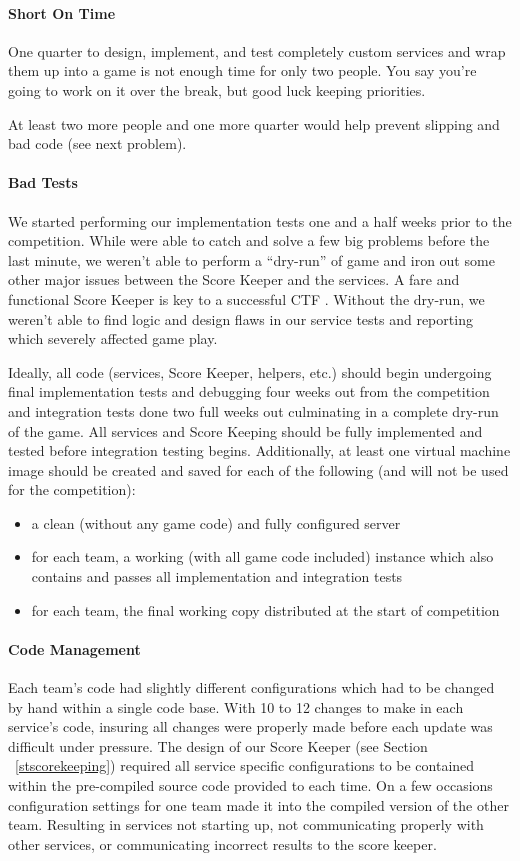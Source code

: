 \documentclass[10pt]{article}
\begin{document}
\paragraph*{Short On Time} One quarter to design, implement, and test completely
custom services and wrap them up into a game is not enough time for only two
people. You say you're going to work on it over the break, but good luck keeping
priorities.

At least two more people and one more quarter would help prevent slipping and
bad code (see next problem).

\paragraph*{Bad Tests} We started performing our implementation tests one and a
half weeks prior to the competition. While were able to catch and solve a few
big problems before the last minute, we weren't able to perform a ``dry-run'' of
game and iron out some other major issues between the Score Keeper and the
services. A fare and functional Score Keeper is key to a successful CTF
\cite{BlackHat2004}. Without the dry-run, we weren't able to find logic and
design flaws in our service tests and reporting which severely affected game
play.

Ideally, all code (services, Score Keeper, helpers, etc.) should begin
undergoing final implementation tests and debugging four weeks out from the
competition and integration tests done two full weeks out culminating in a
complete dry-run of the game. All services and Score Keeping should be fully
implemented and tested before integration testing begins. Additionally, at least
one virtual machine image should be created and saved for each of the following
(and will not be used for the competition):

\begin{itemize}
  \item a clean (without any game code) and fully configured server
  \item for each team, a working (with all game code included) instance which
  also contains and passes all implementation and integration tests
  \item for each team, the final working copy distributed at the start of
  competition
\end{itemize}

\paragraph*{Code Management} Each team's code had slightly different
configurations which had to be changed by hand within a single code base. With
10 to 12 changes to make in each service's code, insuring all changes were
properly made before each update was difficult under pressure. The design of
our Score Keeper (see Section ~\ref{stscorekeeping}) required all service
specific configurations to be contained within the pre-compiled source code
provided to each time. On a few occasions configuration settings for one team
made it into the compiled version of the other team. Resulting in services not
starting up, not communicating properly with other services, or communicating
incorrect results to the score keeper.
\end{document}
